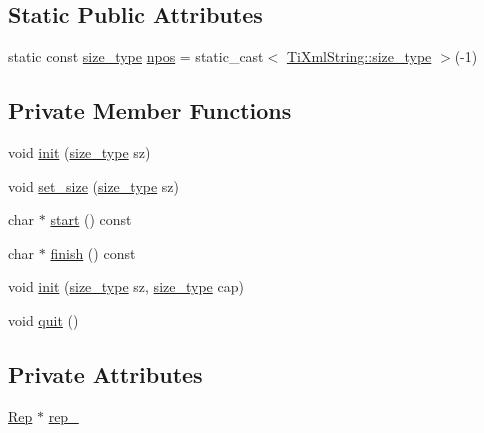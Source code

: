 \subsection*{Static Public Attributes}
\begin{DoxyCompactItemize}
\item 
static const \hyperlink{class_ti_xml_string_abeb2c1893a04c17904f7c06546d0b971}{size\_\-type} \hyperlink{class_ti_xml_string_a8f4422d227088dc7bec96f479b275d0a}{npos} = static\_\-cast$<$ \hyperlink{class_ti_xml_string_abeb2c1893a04c17904f7c06546d0b971}{TiXmlString::size\_\-type} $>$(-\/1)
\end{DoxyCompactItemize}
\subsection*{Private Member Functions}
\begin{DoxyCompactItemize}
\item 
void \hyperlink{class_ti_xml_string_a694eacb51c43d8eba8aa7d4552b598ff}{init} (\hyperlink{class_ti_xml_string_abeb2c1893a04c17904f7c06546d0b971}{size\_\-type} sz)
\item 
void \hyperlink{class_ti_xml_string_a5d70615367bf2920c25feddf6ac4ad30}{set\_\-size} (\hyperlink{class_ti_xml_string_abeb2c1893a04c17904f7c06546d0b971}{size\_\-type} sz)
\item 
char $\ast$ \hyperlink{class_ti_xml_string_a36417caceebe25352f53a87e8cd966b4}{start} () const 
\item 
char $\ast$ \hyperlink{class_ti_xml_string_a58faf1c6b9828c8d5d5092bebf146167}{finish} () const 
\item 
void \hyperlink{class_ti_xml_string_ae11cd23e090fd2e7bb62eda05b45a2d6}{init} (\hyperlink{class_ti_xml_string_abeb2c1893a04c17904f7c06546d0b971}{size\_\-type} sz, \hyperlink{class_ti_xml_string_abeb2c1893a04c17904f7c06546d0b971}{size\_\-type} cap)
\item 
void \hyperlink{class_ti_xml_string_aa6008ae51286a342cd366fbf1e3eeafc}{quit} ()
\end{DoxyCompactItemize}
\subsection*{Private Attributes}
\begin{DoxyCompactItemize}
\item 
\hyperlink{struct_ti_xml_string_1_1_rep}{Rep} $\ast$ \hyperlink{class_ti_xml_string_ac7be48f31ca451bcb16de428b5c40e0c}{rep\_\-}
\end{DoxyCompactItemize}
